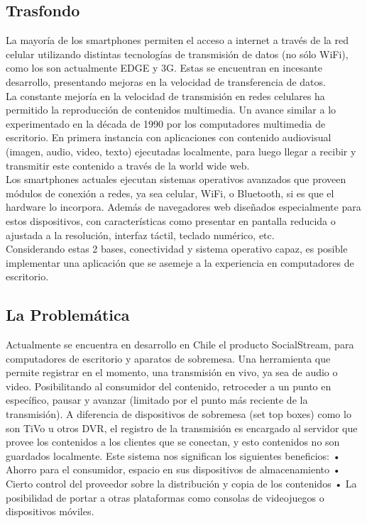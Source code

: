 \subsection{Trasfondo}

La mayoría de los smartphones permiten el acceso a internet a través de la red celular utilizando distintas tecnologías de transmisión de datos (no sólo WiFi), como los son actualmente EDGE y 3G. Estas se encuentran en incesante desarrollo, presentando mejoras en la velocidad de transferencia de datos.\\

La constante mejoría en la velocidad de transmisión en redes celulares ha permitido la reproducción de contenidos multimedia. Un avance similar a lo experimentado en la década de 1990 por los computadores multimedia de escritorio. En primera instancia con aplicaciones con contenido audiovisual (imagen, audio, video, texto) ejecutadas localmente, para luego llegar a recibir y transmitir este contenido a través de la world wide web.\\

Los smartphones actuales ejecutan sistemas operativos avanzados que proveen módulos de conexión  a redes, ya sea celular, WiFi, o Bluetooth, si es que el hardware lo incorpora. Además de navegadores web diseñados especialmente para estos dispositivos, con características como presentar en pantalla reducida o ajustada a la resolución, interfaz táctil, teclado numérico, etc.\\

Considerando estas 2 bases, conectividad y sistema operativo capaz, es posible implementar una aplicación que se asemeje a la experiencia en computadores de escritorio.\\


\subsection{La Problemática}
Actualmente se encuentra en desarrollo en Chile el producto SocialStream, para computadores de escritorio y aparatos de sobremesa. 
Una herramienta que permite registrar en el momento, una transmisión en vivo, ya sea de audio o video. Posibilitando al consumidor del contenido, retroceder a un punto en específico, pausar  y avanzar (limitado por el punto más reciente de la transmisión). 
A diferencia de dispositivos de sobremesa (set top boxes) como lo son TiVo u otros DVR, el registro de la transmisión es encargado al servidor que provee los contenidos a los clientes que se conectan, y esto contenidos no son guardados localmente.
Este sistema nos significan los siguientes beneficios: 
•	Ahorro para el consumidor, espacio en sus dispositivos de almacenamiento
•	Cierto control del proveedor sobre la distribución  y copia de los contenidos
•	La posibilidad de portar a otras plataformas como consolas de videojuegos o dispositivos móviles.

